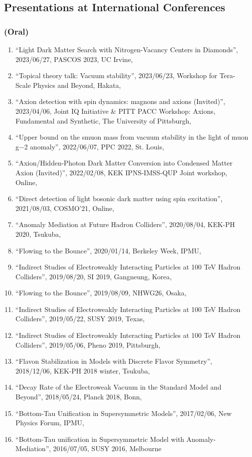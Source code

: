 \documentclass[12pt]{article}
\begin{document}
\subsection*{Presentations at International Conferences}
\subsubsection*{(Oral)}
\begin{enumerate}
 \item ``Light Dark Matter Search with Nitrogen-Vacancy Centers in Diamonds'', 2023/06/27, PASCOS 2023, UC Irvine,\item ``Topical theory talk: Vacuum stability'', 2023/06/23, Workshop for Tera-Scale Physics and Beyond, Hakata,\item ``Axion detection with spin dynamics: magnons and axions (Invited)'', 2023/04/06, Joint IQ Initiative & PITT PACC Workshop: Axions, Fundamental and Synthetic, The University of Pittsburgh,\item ``Upper bound on the smuon mass from vacuum stability in the light of muon g−2 anomaly'', 2022/06/07, PPC 2022, St. Louis,\item ``Axion/Hidden-Photon Dark Matter Conversion into Condensed Matter Axion (Invited)'', 2022/02/08, KEK IPNS-IMSS-QUP Joint workshop, Online,\item ``Direct detection of light bosonic dark matter using spin excitation'', 2021/08/03, COSMO'21, Online,\item ``Anomaly Mediation at Future Hadron Colliders'', 2020/08/04, KEK-PH 2020, Tsukuba,\item ``Flowing to the Bounce'', 2020/01/14, Berkeley Week, IPMU,\item ``Indirect Studies of Electroweakly Interacting Particles at 100 TeV Hadron Colliders'', 2019/08/20, SI 2019, Gangneung, Korea,\item ``Flowing to the Bounce'', 2019/08/09, NHWG26, Osaka,\item ``Indirect Studies of Electroweakly Interacting Particles at 100 TeV Hadron Colliders'', 2019/05/22, SUSY 2019, Texas,\item ``Indirect Studies of Electroweakly Interacting Particles at 100 TeV Hadron Colliders'', 2019/05/06, Pheno 2019, Pittsburgh,\item ``Flavon Stabilization in Models with Discrete Flavor Symmetry'', 2018/12/06, KEK-PH 2018 winter, Tsukuba,\item ``Decay Rate of the Electroweak Vacuum in the Standard Model and Beyond'', 2018/05/24, Planck 2018, Bonn,\item ``Bottom-Tau Unification in Supersymmetric Models'', 2017/02/06, New Physics Forum, IPMU,\item ``Bottom-Tau unification in Supersymmetric Model with Anomaly-Mediation'', 2016/07/05, SUSY 2016, Melbourne
\end{enumerate}
\end{document}

